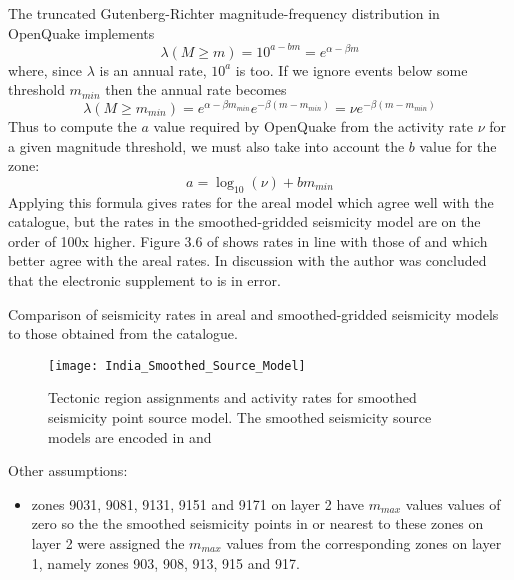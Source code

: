 \documentclass{article}
\begin{document}
The truncated Gutenberg-Richter magnitude-frequency distribution in OpenQuake implements
$$\lambda(M \geq m) = 10^{a - b m} = e^{\alpha - \beta m}$$
where, since $\lambda$ is an annual rate, $10^a$ is too. If we ignore events below some threshold $m_{min}$ then the annual rate becomes
$$\lambda(M \geq m_{min}) = e^{\alpha - \beta m_{min}} e^{-\beta (m - m_{min})} = \nu e^{-\beta (m - m_{min})} $$
Thus to compute the $a$ value required by OpenQuake from the activity rate $\nu$ for a given magnitude threshold, we must also take into account the $b$ value for the zone:
$$a = \log_{10}(\nu) + b m_{min}$$
Applying this formula gives rates for the areal model which agree well with the catalogue, but the rates in the smoothed-gridded seismicity model are on the order of 100x higher. Figure 3.6 of \cite{thingbaijam2011synoptic} shows rates in line with those of \cite{thingbaijam2011seismogenic} and which better agree with the areal rates. In discussion with the author was concluded that the electronic supplement to \cite{nath2012probabilistic} is in error.

\begin{table}
\caption[Comparison of seismicity rates]{Comparison of seismicity rates in areal and smoothed-gridded seismicity models to those obtained from the catalogue.}
\label{table:Rates}
\centering

\end{table}

\begin{figure}[!htb]
\begin{adjustbox}{center}
\texttt{[image: India\_Smoothed\_Source\_Model]}
\end{adjustbox}
\caption[Smoothed seismicity point source model]{Tectonic region assignments and activity rates for smoothed seismicity point source model. The smoothed seismicity source models are encoded in \texttt{} and \texttt{}}
\label{fig:SmoothedSourceModel}
\end{figure}

Other assumptions:
\begin{itemize}
\item zones 9031, 9081, 9131, 9151 and 9171 on layer 2 have $m_{max}$ values values of zero so the the smoothed seismicity points in or nearest to these zones on layer 2 were assigned the $m_{max}$ values from the corresponding zones on layer 1, namely zones 903, 908, 913, 915 and 917.
\end{itemize}
\end{document}
